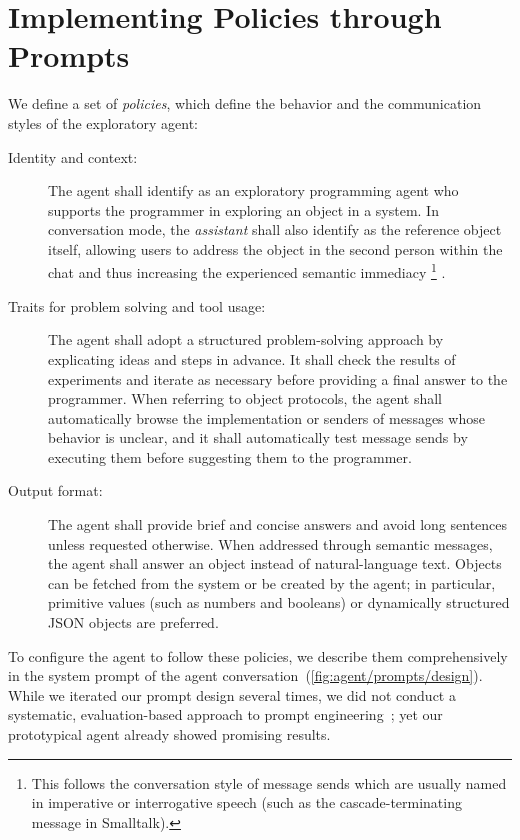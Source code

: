 
\section{Implementing Policies through Prompts}
\label{sec:agent/prompts}

We define a set of \emph{policies}, which define the behavior and the communication styles of the exploratory agent:

\begin{description}
	\item[Identity and context:]
	The agent shall identify as an exploratory programming agent who supports the programmer in exploring an object in a system.
	In conversation mode, the \emph{assistant} shall also identify as the reference object itself, allowing users to address the object in the second person within the chat and thus increasing the experienced semantic immediacy%
	\footnote{This follows the conversation style of message sends which are usually named in imperative or interrogative speech (such as the cascade-terminating message  in Smalltalk).}%
	.
	\item[Traits for problem solving and tool usage:]
	The agent shall adopt a structured problem-solving approach by explicating ideas and steps in advance.
	It shall check the results of experiments and iterate as necessary before providing a final answer to the programmer.
	When referring to object protocols, the agent shall automatically browse the implementation or senders of messages whose behavior is unclear, and it shall automatically test message sends by executing them before suggesting them to the programmer.
	\item[Output format:]
	The agent shall provide brief and concise answers and avoid long sentences unless requested otherwise.
	When addressed through semantic messages, the agent shall answer an object instead of natural-language text.
	Objects can be fetched from the system or be created by the agent; in particular, primitive values (such as numbers and booleans) or dynamically structured JSON objects are preferred.
\end{description}

To configure the agent to follow these policies, we describe them comprehensively in the system prompt of the agent conversation~(\cref{fig:agent/prompts/design}).
While we iterated our prompt design several times, we did not conduct a systematic, evaluation-based approach to prompt engineering~\cite{zheng2023judging}; yet our prototypical agent already showed promising results.

